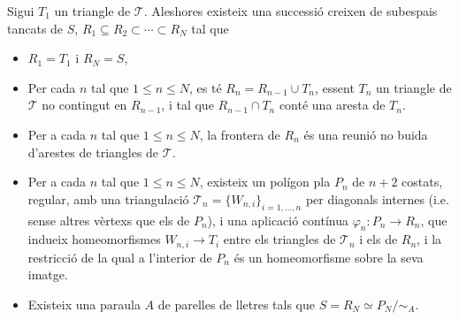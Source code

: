 \documentclass[../main.tex]{subfiles}
\begin{document}
\begin{lema}
\label{lema:triangulacio1} Sigui $T_1$ un triangle de $\mathcal{T}$. Aleshores existeix una successió creixen de subespais tancats de $S$, $R_1\subseteq R_2\subset\cdots\subset R_N$ tal que
\begin{itemize}
    \item $R_1 = T_1$ i $R_N=S$,
    \item Per cada $n$ tal que $1\leq n \leq N$, es té $R_n = R_{n-1}\cup T_n$, essent $T_n$ un triangle de $\mathcal{T}$ no contingut en $R_{n-1}$, i tal que $R_{n-1}\cap T_n$ conté una aresta de $T_n$.
    \item Per a cada $n$ tal que $1\leq n\leq N$, la frontera de $R_n$ és una reunió no buida d'arestes de triangles de $\mathcal{T}$.
    \item Per a cada $n$ tal que $1\leq n\leq N$, existeix un polígon pla $P_n$ de $n+2$ costats, regular, amb una triangulació $\mathcal{T}_n = \{W_{n,i}\}_{i=1,\ldots,n}$ per diagonals internes (i.e. sense altres vèrtexs que els de $P_n$), i una aplicació contínua $\varphi_n:P_n\rightarrow R_n$, que indueix homeomorfismes $W_{n,i}\rightarrow T_i$ entre els triangles de $\mathcal{T}_n$ i els de $R_n$, i la restricció de la qual a l'interior de $P_n$ és un homeomorfisme sobre la seva imatge.
    \item Existeix una paraula $A$ de parelles de lletres tals que $S = R_N\simeq P_N/\sim_A$.
\end{itemize}
\end{lema}
\end{document}
